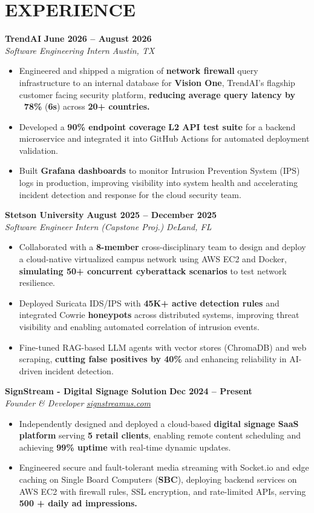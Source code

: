 \documentclass[letterpaper,10pt]{article}
\begin{document}
\section*{EXPERIENCE}
\noindent
\noindent
\noindent
\textbf{TrendAI} \hfill \textbf{June 2026 -- August 2026} \\
\textit{Software Engineering Intern \hfill Austin, TX} 
\begin{itemize}[itemsep=-2pt]
    \item Engineered and shipped a migration of \textbf{network firewall} query infrastructure to an internal database for \textbf{Vision One}, TrendAI's flagship customer facing security platform, \textbf{reducing average query latency by ~78\%} (\textbf{6s}) across \textbf{20+ countries.}
    \item Developed a \textbf{90\% endpoint coverage} \textbf{L2 API test suite} for a backend microservice and integrated it into GitHub Actions for automated deployment validation.
    \item Built \textbf{Grafana dashboards} to monitor Intrusion Prevention System (IPS) logs in production, improving visibility into system health and accelerating incident detection and response for the cloud security team.
\end{itemize}
\textbf{Stetson University} \hfill \textbf{August 2025 -- December 2025}\\
\textit{Software Engineer Intern (Capstone Proj.)}
\hfill \textit{DeLand, FL} 
\begin{itemize}[itemsep=-2pt]
    \item Collaborated with a \textbf{8-member} cross-disciplinary team to design and deploy a cloud-native virtualized campus network using AWS EC2 and Docker,  \textbf{simulating 50+ concurrent cyberattack scenarios} to test network resilience.
    \item Deployed Suricata IDS/IPS with \textbf{45K+ active detection rules} and integrated Cowrie \textbf{honeypots} across distributed systems, improving threat visibility and enabling automated correlation of intrusion events.
    \item Fine-tuned RAG-based LLM agents with vector stores (ChromaDB) and web scraping, \textbf{cutting false positives by 40\%} and enhancing reliability in AI-driven incident detection.
\end{itemize}
\textbf{SignStream - Digital Signage Solution} \hfill \textbf{Dec 2024 -- Present} \\
\textit{Founder \& Developer} \hfill \href{https://signstreamus.com}{\textit{signstreamus.com}}
\begin{itemize}[itemsep=-2pt]
    \item Independently designed and deployed a cloud-based \textbf{digital signage SaaS platform} serving \textbf{5 retail clients}, enabling remote content scheduling and achieving \textbf{99\% uptime} with real-time dynamic updates.
    \item Engineered secure and fault-tolerant media streaming with Socket.io and edge caching on Single Board Computers (\textbf{SBC}), deploying backend services on AWS EC2 with firewall rules, SSL encryption, and rate-limited APIs, serving \textbf{500 + daily ad impressions.}
\end{itemize}
\end{document}
